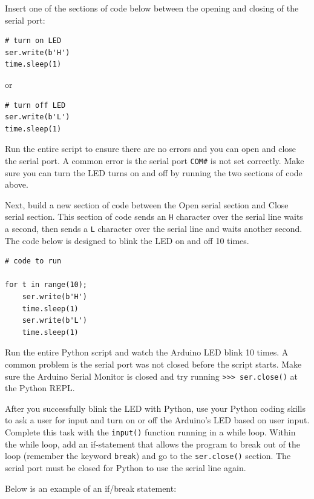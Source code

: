 \documentclass[11pt]{article}
\begin{document}
Insert one of the sections of code below between the opening and closing
of the serial port:

\begin{verbatim}
# turn on LED
ser.write(b'H')
time.sleep(1)
\end{verbatim}

or

\begin{verbatim}
# turn off LED
ser.write(b'L')
time.sleep(1)
\end{verbatim}

Run the entire script to ensure there are no errors and you can open and
close the serial port. A common error is the serial port
\texttt{\textquotesingle{}COM\#\textquotesingle{}} is not set correctly.
Make sure you can turn the LED turns on and off by running the two sections
of code above.

Next, build a new section of code between the Open serial section and
Close serial section. This section of code sends an
\texttt{\textquotesingle{}H\textquotesingle{}} character over the serial
line waits a second, then sends a
\texttt{\textquotesingle{}L\textquotesingle{}} character over the serial
line and waits another second. The code below is designed to blink the
LED on and off 10 times.

\begin{verbatim}
# code to run

for t in range(10);
    ser.write(b'H')
    time.sleep(1)
    ser.write(b'L')
    time.sleep(1)
\end{verbatim}

    Run the entire Python script and watch the Arduino LED blink 10 times. A
common problem is the serial port was not closed before the script
starts. Make sure the Arduino Serial Monitor is closed and try running
\texttt{\textgreater{}\textgreater{}\textgreater{}\ ser.close()} at the
Python REPL.

After you successfully blink the LED with Python, use your Python coding
skills to ask a user for input and turn on or off the Arduino's LED
based on user input. Complete this task with the \texttt{input()}
function running in a while loop. Within the while loop, add an if-statement that allows the program to break out of the loop (remember the
keyword \texttt{break}) and go to the \texttt{ser.close()} section. The
serial port must be closed for Python to use the serial line again.

Below is an example of an if/break statement:
\end{document}
